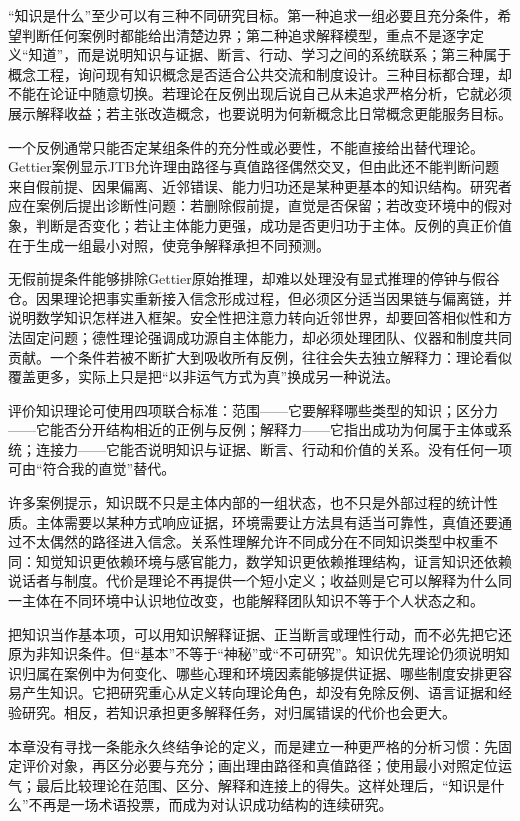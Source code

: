 “知识是什么”至少可以有三种不同研究目标。第一种追求一组必要且充分条件，希望判断任何案例时都能给出清楚边界；第二种追求解释模型，重点不是逐字定义“知道”，而是说明知识与证据、断言、行动、学习之间的系统联系；第三种属于概念工程，询问现有知识概念是否适合公共交流和制度设计。三种目标都合理，却不能在论证中随意切换。若理论在反例出现后说自己从未追求严格分析，它就必须展示解释收益；若主张改造概念，也要说明为何新概念比日常概念更能服务目标。

一个反例通常只能否定某组条件的充分性或必要性，不能直接给出替代理论。Gettier案例显示JTB允许理由路径与真值路径偶然交叉，但由此还不能判断问题来自假前提、因果偏离、近邻错误、能力归功还是某种更基本的知识结构。研究者应在案例后提出诊断性问题：若删除假前提，直觉是否保留；若改变环境中的假对象，判断是否变化；若让主体能力更强，成功是否更归功于主体。反例的真正价值在于生成一组最小对照，使竞争解释承担不同预测。

无假前提条件能够排除Gettier原始推理，却难以处理没有显式推理的停钟与假谷仓。因果理论把事实重新接入信念形成过程，但必须区分适当因果链与偏离链，并说明数学知识怎样进入框架。安全性把注意力转向近邻世界，却要回答相似性和方法固定问题；德性理论强调成功源自主体能力，却必须处理团队、仪器和制度共同贡献。一个条件若被不断扩大到吸收所有反例，往往会失去独立解释力：理论看似覆盖更多，实际上只是把“以非运气方式为真”换成另一种说法。

\begin{argumentbox}
评价知识理论可使用四项联合标准：范围——它要解释哪些类型的知识；区分力——它能否分开结构相近的正例与反例；解释力——它指出成功为何属于主体或系统；连接力——它能否说明知识与证据、断言、行动和价值的关系。没有任何一项可由“符合我的直觉”替代。
\end{argumentbox}

许多案例提示，知识既不只是主体内部的一组状态，也不只是外部过程的统计性质。主体需要以某种方式响应证据，环境需要让方法具有适当可靠性，真值还要通过不太偶然的路径进入信念。关系性理解允许不同成分在不同知识类型中权重不同：知觉知识更依赖环境与感官能力，数学知识更依赖推理结构，证言知识还依赖说话者与制度。代价是理论不再提供一个短小定义；收益则是它可以解释为什么同一主体在不同环境中认识地位改变，也能解释团队知识不等于个人状态之和。

把知识当作基本项，可以用知识解释证据、正当断言或理性行动，而不必先把它还原为非知识条件\parencite{williamson2000}。但“基本”不等于“神秘”或“不可研究”。知识优先理论仍须说明知识归属在案例中为何变化、哪些心理和环境因素能够提供证据、哪些制度安排更容易产生知识。它把研究重心从定义转向理论角色，却没有免除反例、语言证据和经验研究。相反，若知识承担更多解释任务，对归属错误的代价也会更大。

本章没有寻找一条能永久终结争论的定义，而是建立一种更严格的分析习惯：先固定评价对象，再区分必要与充分；画出理由路径和真值路径；使用最小对照定位运气；最后比较理论在范围、区分、解释和连接上的得失。这样处理后，“知识是什么”不再是一场术语投票，而成为对认识成功结构的连续研究。
